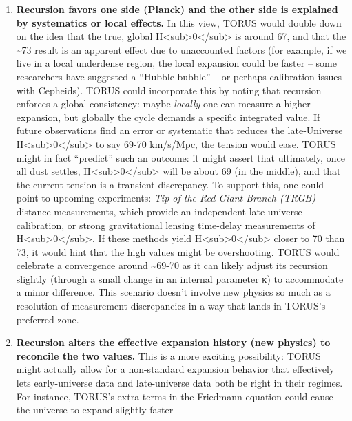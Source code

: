 \documentclass[]{article}
\begin{document}
\begin{enumerate}
\def\labelenumi{\arabic{enumi}.}
\item
  \textbf{Recursion favors one side (Planck) and the other side is
  explained by systematics or local effects.} In this view, TORUS would
  double down on the idea that the true, global
  H\textless{}sub\textgreater{}0\textless{}/sub\textgreater{} is around
  67, and that the \textasciitilde{}73 result is an apparent effect due
  to unaccounted factors (for example, if we live in a local underdense
  region, the local expansion could be faster -- some researchers have
  suggested a ``Hubble bubble'' -- or perhaps calibration issues with
  Cepheids). TORUS could incorporate this by noting that recursion
  enforces a global consistency: maybe \emph{locally} one can measure a
  higher expansion, but globally the cycle demands a specific integrated
  value. If future observations find an error or systematic that reduces
  the late-Universe
  H\textless{}sub\textgreater{}0\textless{}/sub\textgreater{} to say
  69-70 km/s/Mpc, the tension would ease. TORUS might in fact
  ``predict'' such an outcome: it might assert that ultimately, once all
  dust settles,
  H\textless{}sub\textgreater{}0\textless{}/sub\textgreater{} will be
  about 69 (in the middle)​, and that the current tension is a transient
  discrepancy. To support this, one could point to upcoming experiments:
  \emph{Tip of the Red Giant Branch (TRGB)} distance measurements, which
  provide an independent late-universe calibration, or strong
  gravitational lensing time-delay measurements of
  H\textless{}sub\textgreater{}0\textless{}/sub\textgreater{}. If these
  methods yield
  H\textless{}sub\textgreater{}0\textless{}/sub\textgreater{} closer to
  70 than 73, it would hint that the high values might be overshooting.
  TORUS would celebrate a convergence around \textasciitilde{}69-70 as
  it can likely adjust its recursion slightly (through a small change in
  an internal parameter κ) to accommodate a minor difference​. This
  scenario doesn't involve new physics so much as a resolution of
  measurement discrepancies in a way that lands in TORUS's preferred
  zone.
\item
  \textbf{Recursion alters the effective expansion history (new physics)
  to reconcile the two values.} This is a more exciting possibility:
  TORUS might actually allow for a non-standard expansion behavior that
  effectively lets early-universe data and late-universe data both be
  right in their regimes. For instance, TORUS's extra terms in the
  Friedmann equation could cause the universe to expand slightly faster

\end{enumerate}
\end{document}
